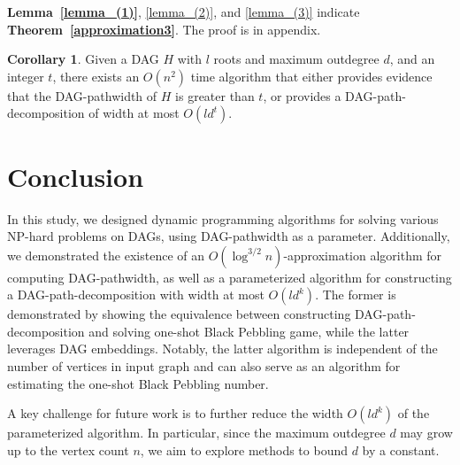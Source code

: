 \documentclass[runningheads]{llncs}
\theoremstyle{plain}
\newtheorem{cor}{Corollary}
\theoremstyle{definition}
\newtheorem{cor}{Corollary}
\begin{document}
\textbf{Lemma~\ref{lemma_(1)}}, \ref{lemma_(2)}, and \ref{lemma_(3)} indicate \textbf{Theorem~\ref{approximation3}}. The proof is in appendix.

\begin{cor}\label{cor}
    Given a DAG $H$ with $l$ roots and maximum outdegree $d$, and an integer $t$, there exists an $O(n^2)$ time algorithm that either provides evidence that the DAG-pathwidth of $H$ is greater than $t$, or provides a DAG-path-decomposition of width at most $O(ld^t)$.
\end{cor}








































\section{Conclusion}

In this study, we designed dynamic programming algorithms for solving various NP-hard problems on DAGs, using DAG-pathwidth as a parameter. Additionally, we demonstrated the existence of an $O(\log^{3/2} n)$-approximation algorithm for computing DAG-pathwidth, as well as a parameterized algorithm for constructing a DAG-path-decomposition with width at most $O(ld^k)$. The former is demonstrated by showing the equivalence between constructing DAG-path-decomposition and solving one-shot Black Pebbling game, while the latter leverages DAG embeddings. Notably, the latter algorithm is independent of the number of vertices in input graph and can also serve as an algorithm for estimating the one-shot Black Pebbling number.

A key challenge for future work is to further reduce the width $O(ld^k)$ of the parameterized algorithm. In particular, since the maximum outdegree $d$ may grow up to the vertex count $n$, we aim to explore methods to bound $d$ by a constant.
\end{document}
